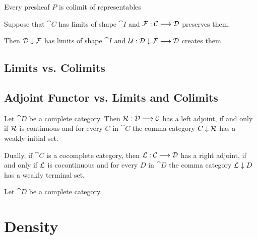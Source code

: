 	\begin{proposition}
	\end{proposition}

	\begin{theorem}
		Every presheaf $P$ is colimit of representables
	\end{theorem}

	\begin{proposition}
		Suppose that $\cat{C}$ has limits of shape $\cat{I}$ and $\mathcal{F}:\mathcal{C} --> \mathcal{D}$ preserves them.

		Then $\mathcal{D} \downarrow \mathcal{F}$ has limits of shape $\cat{I}$ and $\mathcal{U}: \mathcal{D} \downarrow \mathcal{F} --> \mathcal{D}$ creates them.
	\end{proposition}

	\subsection{Limits vs. Colimits}
	\subsection{Adjoint Functor vs. Limits and Colimits}

	\begin{proposition}
		\TODO{todo}
	\end{proposition}

	\begin{theorem}
		Let $\cat{D}$ be a complete category. Then $\mathcal{R}: \mathcal{D} --> \mathcal{C}$ has a left adjoint, if and only if $\mathcal{R}$ is continuous and for every $C$ in $\cat{C}$ the comma category $C \downarrow \mathcal{R}$ has a weakly initial set.

		Dually, if $\cat{C}$ is a cocomplete category, then $\mathcal{L}: \mathcal{C} --> \mathcal{D}$ has a right adjoint, if and only if $\mathcal{L}$ is cocontinuous and for every $D$ in $\cat{D}$ the comma category $\mathcal{L} \downarrow D$ has a weakly terminal set.
	\end{theorem}

	\begin{theorem}
		Let $\cat{D}$ be a complete category. 
	\end{theorem}

	\section{Density}
